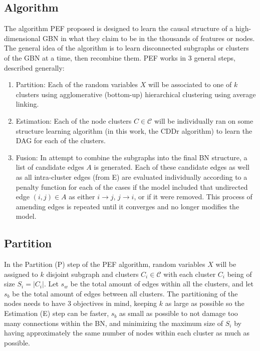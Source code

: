 \documentclass[twoside,11pt]{article}
\let\mc\mathcal
\begin{document}
\subsection{Algorithm}

The algorithm PEF proposed is designed to learn the causal structure of a high-dimensional GBN in what they claim to be in the thousands of features or nodes. The general idea of the algorithm is to learn disconnected subgraphs or clusters of the GBN at a time, then recombine them. PEF works in 3 general steps, described generally:
\begin{enumerate}
    \item Partition: Each of the random variables $X$ will be associated to one of $k$ clusters using agglomerative (bottom-up) hierarchical clustering using average linking.
    \item Estimation: Each of the node clusters $C\in\mathcal{C}$ will be individually ran on some structure learning algorithm (in this work, the CDDr algorithm) to learn the DAG for each of the clusters.
    \item Fusion: In attempt to combine the subgraphs into the final BN structure, a list of candidate edges $A$ is generated. Each of these candidate edges as well as all intra-cluster edges (from E) are evaluated individually according to a penalty function for each of the cases if the model included that undirected edge $(i,j)\in A$ as either $i\rightarrow j$, $j\rightarrow i$, or if it were removed. This process of amending edges is repeated until it converges and no longer modifies the model.
\end{enumerate}

\subsection{Partition}

In the Partition (P) step of the PEF algorithm, random variables $X$ will be assigned to $k$ disjoint subgraph and clusters $C_i\in \mc{C}$ with each cluster $C_i$ being of size $S_i=|C_i|$. Let $s_w$ be the total amount of edges within all the clusters, and let $s_b$ be the total amount of edges between all clusters. The partitioning of the nodes needs to have 3 objectives in mind, keeping $k$ as large as possible so the Estimation (E) step can be faster, $s_b$ as small as possible to not damage too many connections within the BN, and minimizing the maximum size of $S_i$ by having approximately the same number of nodes within each cluster as much as possible.
\end{document}
